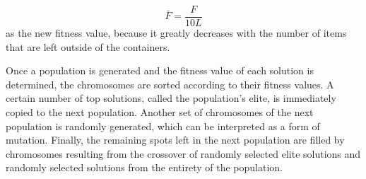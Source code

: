 \begin{equation}
    \bar{F} = \frac{F}{10L}
\end{equation}
as the new fitness value, because it greatly decreases with the number of items that are left outside of the containers.

Once a population is generated and the fitness value of each solution is determined, the chromosomes are sorted according to their fitness values. A certain number of top solutions, called the population's elite, is immediately copied to the next population. Another set of chromosomes of the next population is randomly generated, which can be interpreted as a form of mutation. Finally, the remaining spots left in the next population are filled by chromosomes resulting from the crossover of randomly selected elite solutions and randomly selected solutions from the entirety of the population.